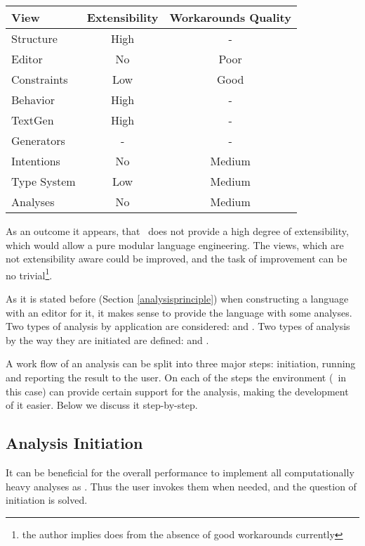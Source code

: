 \begin{center}
\begin{tabular}{l|c|c}
\textbf{View} & \textbf{Extensibility} & \textbf{Workarounds Quality} \\
\hline
Structure & High & -\\
Editor & No & Poor\\
Constraints & Low & Good\\
Behavior & High & -\\
TextGen & High & -\\
Generators & - & -\\
Intentions & No & Medium\\
Type System & Low & Medium\\
Analyses & No & Medium
\end{tabular}
\end{center}


As an outcome it appears, that \jbmps\ does not provide a high degree of extensibility, which would allow 
a pure modular language engineering. The views, which are not extensibility aware could be improved, and the
task of improvement can be no trivial\footnote{the author implies does from the absence of good workarounds currently}.


As it is stated before (Section \ref{analysisprinciple}) when constructing a language with an editor for it, 
it makes sense to provide the language with some analyses. Two types of analysis by application are considered:
 and . Two types of analysis by the way they are initiated are defined: 
 and .

A work flow of an analysis can be split into three major steps: initiation, running and reporting the result to the user.
On each of the steps the environment (\jbmps\ in this case) can provide certain support for the analysis, making the 
development of it easier. Below we discuss it step-by-step.

\subsection{Analysis Initiation}

It can be beneficial for the overall  performance to implement all computationally heavy analyses 
as . Thus the user invokes them when needed, and the question of initiation is solved.

